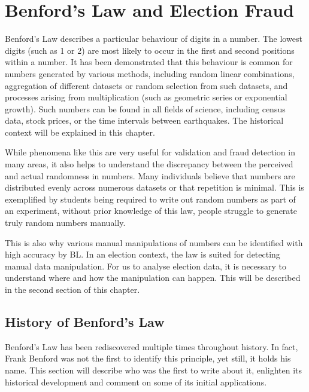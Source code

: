 \chapter{Benford’s Law and Election Fraud} %

Benford's Law describes a particular behaviour of digits in a number. The lowest digits (such as 1 or 2) are most likely to occur in the first and second positions within a number. It has been demonstrated that this behaviour is common for numbers generated by various methods, including random linear combinations, aggregation of different datasets or random selection from such datasets, and processes arising from multiplication (such as geometric series or exponential growth). Such numbers can be found in all fields of science, including census data, stock prices, or the time intervals between earthquakes. The historical context will be explained in this chapter. \cite{Hronova2023,kossovsky2014benford, Cerqueti2202} %

While phenomena like this are very useful for validation and fraud detection in many areas, it also helps to understand the discrepancy between the perceived and actual randomness in numbers. Many individuals believe that numbers are distributed evenly across numerous datasets or that repetition is minimal. This is exemplified by students being required to write out random numbers as part of an experiment, without prior knowledge of this law, people struggle to generate truly random numbers manually. \cite{kossovsky2014benford, Beber2012} %

This is also why various manual manipulations of numbers can be identified with high accuracy by BL. In an election context, the law is suited for detecting manual data manipulation. For us to analyse election data, it is necessary to understand where and how the manipulation can happen. This will be described in the second section of this chapter. 

\section{History of Benford's Law}

Benford's Law has been rediscovered multiple times throughout history. In fact, Frank Benford was not the first to identify this principle, yet still, it holds his name. This section will describe who was the first to write about it, enlighten its historical development and comment on some of its initial applications.

